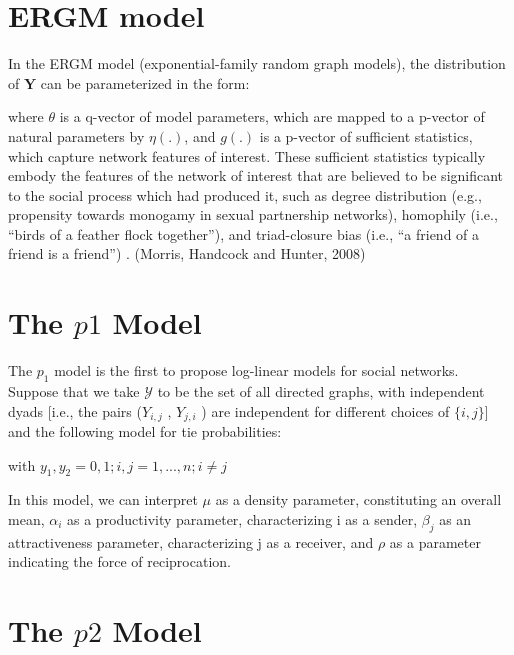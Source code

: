 \documentclass[12pt]{ociamthesis}  %
\begin{document}
	
	\section{ERGM model}
	In the ERGM model (exponential-family random graph models), the distribution of $\textbf{Y}$ can be parameterized in the form:
	
	
	where $\theta$ is a q-vector of model parameters, which are mapped to a p-vector of natural parameters
	by $\eta(.)$, and $g(.)$ is a p-vector of sufficient statistics, which capture network features of interest. These sufficient statistics typically embody the
	features of the network of interest that are believed to be significant to the social
	process which had produced it, such as degree distribution (e.g., propensity
	towards monogamy in sexual partnership networks), homophily (i.e., “birds of
	a feather flock together”), and triad-closure bias (i.e., “a friend of a friend is a
	friend”) . (Morris, Handcock and Hunter, 2008)
	
	\section{The $p1$ Model}
	
	The $p_{1}$ model is the first to propose log-linear models for social
	networks. Suppose that we take $\mathcal{Y}$ to be the set of all directed graphs, with independent dyads [i.e., the pairs ($Y_{i,j}$ , $Y_{j,i}$ ) are independent for different choices of $\{i, j\}$] and the following model for tie probabilities:
	
	 with $y_{1}, y_{2} = 0,1 ; i,j = 1,...,n; i \neq j $
	
	In this model, we can interpret $\mu$ as a density parameter, constituting an overall mean, $\alpha_{i}$ as a productivity parameter, characterizing i as a sender, $\beta_{j}$ as an attractiveness parameter, characterizing j as a receiver, and $\rho$ as a parameter indicating the force of reciprocation.
	
	\section{The $p2$ Model}
	
\end{document}
